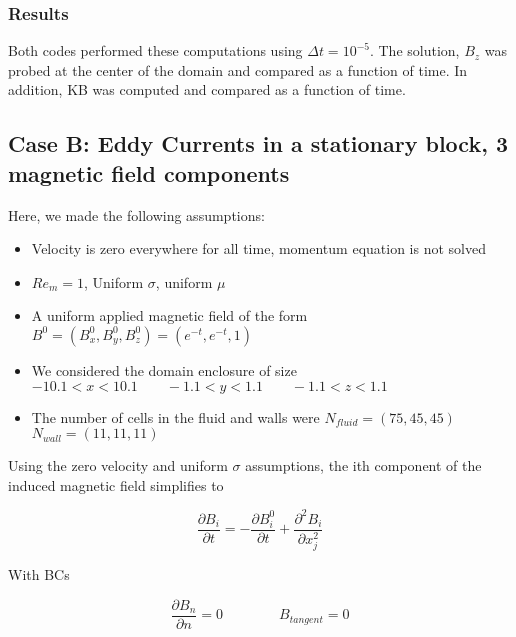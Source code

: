 \documentclass[11pt]{article}
\newcommand{\figS}{22.1em}
\newcommand{\figH}{\figS}
\newcommand{\figW}{\figS}
\begin{document}
\subsubsection{Results}
Both codes performed these computations using $\Delta t = 10^{-5}$. The solution, $B_z$ was probed at the center of the domain and compared as a function of time. In addition, KB was computed and compared as a function of time.

\begin{figure}[H]
 \centering
   \caption[Optional ]{}
\end{figure}

\subsection{Case B: Eddy Currents in a stationary block, 3 magnetic field components}
Here, we made the following assumptions:

\begin{itemize}
\item Velocity is zero everywhere for all time, momentum equation is not solved
\item $Re_m = 1$, Uniform $\sigma$, uniform $\mu$
\item A uniform applied magnetic field of the form $B^0 = (B_x^0,B_y^0,B_z^0) = (e^{-t},e^{-t},1)$
\item We considered the domain enclosure of size $-10.1 < x < 10.1 \qquad -1.1 < y < 1.1 \qquad -1.1 < z < 1.1$
\item The number of cells in the fluid and walls were $N_{fluid} = (75,45,45)$ \qquad $N_{wall} = (11,11,11)$
\end{itemize}

Using the zero velocity and uniform $\sigma$ assumptions, the ith component of the induced magnetic field simplifies to

\begin{equation}
	\frac{\partial B_i}{\partial t}
	=
	-
	\frac{\partial B_i^0}{\partial t}
	+
	\frac{\partial^2 B_i}{\partial x_j^2}
\end{equation}

With BCs

\begin{equation}
	\frac{\partial B_{n}}{\partial n} = 0
	\qquad \qquad
	B_{tangent} = 0
\end{equation}
\end{document}
